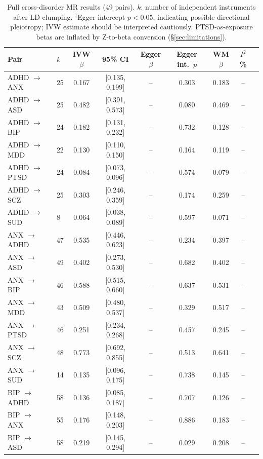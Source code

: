 \documentclass[11pt]{article}
\begin{document}
\begin{table}[h]
\centering
\caption{Full cross-disorder MR results (49 pairs). $k$: number of independent instruments after LD clumping. $^{\dagger}$Egger intercept $p < 0.05$, indicating possible directional pleiotropy; IVW estimate should be interpreted cautiously. PTSD-as-exposure betas are inflated by Z-to-beta conversion (\S\ref{sec:limitations}).}
\label{tab:mr_full}
\footnotesize
\begin{tabular}{llccccccc}
\toprule
Pair & $k$ & IVW $\beta$ & 95\% CI & Egger $\beta$ & Egger int.\ $p$ & WM $\beta$ & $I^2$\% \\
\midrule
ADHD $\to$ ANX & 25 & 0.167 & [0.135, 0.199] & -- & 0.303 & 0.183 & -- \\
ADHD $\to$ ASD & 25 & 0.482 & [0.391, 0.573] & -- & 0.080 & 0.469 & -- \\
ADHD $\to$ BIP & 24 & 0.182 & [0.131, 0.232] & -- & 0.732 & 0.128 & -- \\
ADHD $\to$ MDD & 22 & 0.130 & [0.110, 0.150] & -- & 0.164 & 0.119 & -- \\
ADHD $\to$ PTSD & 24 & 0.084 & [0.073, 0.096] & -- & 0.574 & 0.079 & -- \\
ADHD $\to$ SCZ & 25 & 0.303 & [0.246, 0.359] & -- & 0.174 & 0.259 & -- \\
ADHD $\to$ SUD & 8 & 0.064 & [0.038, 0.089] & -- & 0.597 & 0.071 & -- \\
\midrule
ANX $\to$ ADHD & 47 & 0.535 & [0.446, 0.623] & -- & 0.234 & 0.397 & -- \\
ANX $\to$ ASD & 49 & 0.402 & [0.273, 0.530] & -- & 0.682 & 0.402 & -- \\
ANX $\to$ BIP & 46 & 0.588 & [0.515, 0.660] & -- & 0.637 & 0.531 & -- \\
ANX $\to$ MDD & 43 & 0.509 & [0.480, 0.537] & -- & 0.329 & 0.517 & -- \\
ANX $\to$ PTSD & 46 & 0.251 & [0.234, 0.268] & -- & 0.457 & 0.245 & -- \\
ANX $\to$ SCZ & 48 & 0.773 & [0.692, 0.855] & -- & 0.513 & 0.641 & -- \\
ANX $\to$ SUD & 14 & 0.135 & [0.096, 0.175] & -- & 0.738 & 0.145 & -- \\
\midrule
BIP $\to$ ADHD & 58 & 0.136 & [0.085, 0.187] & -- & 0.707 & 0.126 & -- \\
BIP $\to$ ANX & 55 & 0.176 & [0.148, 0.203] & -- & 0.886 & 0.183 & -- \\
BIP $\to$ ASD & 58 & 0.219 & [0.145, 0.294] & -- & 0.029 & 0.208 & -- \\

\end{tabular}
\end{table}
\end{document}
